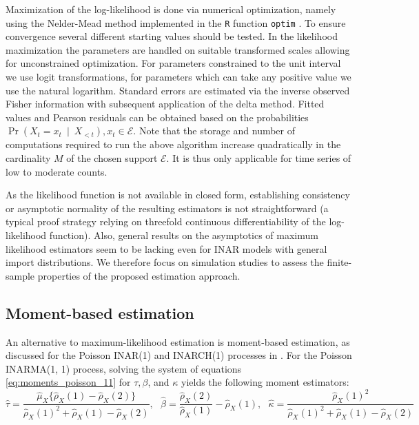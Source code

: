 \documentclass{article}
\begin{document}
Maximization of the log-likelihood is done via numerical optimization, namely using the Nelder-Mead method implemented in the \texttt{R} function \texttt{optim} \citep{RDCT2008}. To ensure convergence several different starting values should be tested. In the likelihood maximization the parameters are handled on suitable transformed scales allowing for unconstrained optimization. For parameters constrained to the unit interval we use logit transformations, for parameters which can take any positive value we use the natural logarithm. Standard errors are estimated via the inverse observed Fisher information with subsequent application of the delta method. Fitted values and Pearson residuals can be obtained based on the probabilities $\Pr(X_t = x_t \ \mid \ X_{< t}), x_t \in \mathcal{E}$. Note that the storage and number of computations required to run the above algorithm increase quadratically in the cardinality $M$ of the chosen support $\mathcal{E}$. It is thus only applicable for time series of low to moderate counts.

As the likelihood function is not available in closed form, establishing consistency or asymptotic normality of the resulting estimators is not straightforward (a typical proof strategy relying on threefold continuous differentiability of the log-likelihood function). Also, general results on the asymptotics of maximum likelihood estimators seem to be lacking even for INAR models with general import distributions. We therefore focus on simulation studies to assess the finite-sample properties of the proposed estimation approach.

\subsection{Moment-based estimation}



An alternative to maximum-likelihood estimation is moment-based estimation, as discussed for the Poisson INAR(1) and INARCH(1) processes in \cite{Weiss2016}. For the Poisson INARMA(1, 1) process, solving the system of equations \eqref{eq:moments_poisson_11}  for $\tau, \beta$, and $\kappa$ yields the following moment estimators:
\begin{equation}
\hat{\tau} = \frac{\hat{\mu}_X\{\hat{\rho}_X(1) - \hat{\rho}_X(2)\}}{\hat{\rho}_X(1)^2 + \hat{\rho}_X(1) - \hat{\rho}_X(2)}, \ \ \ \hat{\beta} = \frac{\hat{\rho}_X(2)}{\hat{\rho}_X(1)} - \hat{\rho}_X(1), \ \ \ \hat{\kappa} = \frac{\hat{\rho}_X(1)^2}{\hat{\rho}_X(1)^2 + \hat{\rho}_X(1) - \hat{\rho}_X(2)}\label{eq:moment_estimators}
\end{equation}
\end{document}
